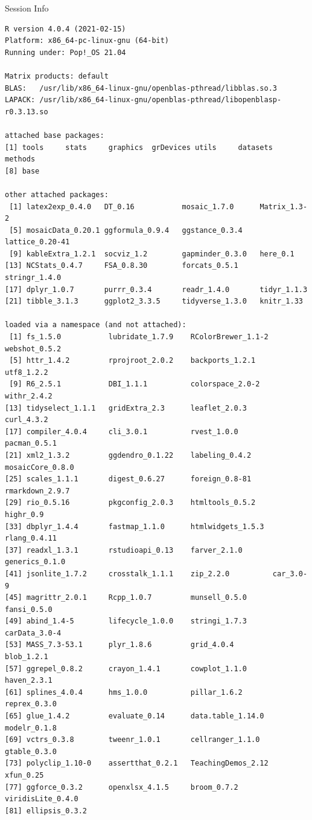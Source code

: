 \documentclass[10pt,handout]{beamer}\usepackage[]{graphicx}\usepackage[]{color}
\makeatletter
\newenvironment{kframe}{%
 \def\at@end@of@kframe{}%
 \ifinner\ifhmode%
  \def\at@end@of@kframe{\end{minipage}}%
  \begin{minipage}{\columnwidth}%
 \fi\fi%
 \def\FrameCommand##1{\hskip\@totalleftmargin \hskip-\fboxsep
 \colorbox{shadecolor}{##1}\hskip-\fboxsep
     \hskip-\linewidth \hskip-\@totalleftmargin \hskip\columnwidth}%
 \MakeFramed {\advance\hsize-\width
   \@totalleftmargin\z@ \linewidth\hsize
   \@setminipage}}%
 {\par\unskip\endMakeFramed%
 \at@end@of@kframe}
\newenvironment{knitrout}{}{} %
\makeatother
\begin{document}
\begin{frame}[fragile]{Session Info}
	\tiny
	
\begin{knitrout}\tiny
{}\color{fgcolor}\begin{kframe}
\begin{verbatim}
R version 4.0.4 (2021-02-15)
Platform: x86_64-pc-linux-gnu (64-bit)
Running under: Pop!_OS 21.04

Matrix products: default
BLAS:   /usr/lib/x86_64-linux-gnu/openblas-pthread/libblas.so.3
LAPACK: /usr/lib/x86_64-linux-gnu/openblas-pthread/libopenblasp-r0.3.13.so

attached base packages:
[1] tools     stats     graphics  grDevices utils     datasets  methods  
[8] base     

other attached packages:
 [1] latex2exp_0.4.0   DT_0.16           mosaic_1.7.0      Matrix_1.3-2     
 [5] mosaicData_0.20.1 ggformula_0.9.4   ggstance_0.3.4    lattice_0.20-41  
 [9] kableExtra_1.2.1  socviz_1.2        gapminder_0.3.0   here_0.1         
[13] NCStats_0.4.7     FSA_0.8.30        forcats_0.5.1     stringr_1.4.0    
[17] dplyr_1.0.7       purrr_0.3.4       readr_1.4.0       tidyr_1.1.3      
[21] tibble_3.1.3      ggplot2_3.3.5     tidyverse_1.3.0   knitr_1.33       

loaded via a namespace (and not attached):
 [1] fs_1.5.0           lubridate_1.7.9    RColorBrewer_1.1-2 webshot_0.5.2     
 [5] httr_1.4.2         rprojroot_2.0.2    backports_1.2.1    utf8_1.2.2        
 [9] R6_2.5.1           DBI_1.1.1          colorspace_2.0-2   withr_2.4.2       
[13] tidyselect_1.1.1   gridExtra_2.3      leaflet_2.0.3      curl_4.3.2        
[17] compiler_4.0.4     cli_3.0.1          rvest_1.0.0        pacman_0.5.1      
[21] xml2_1.3.2         ggdendro_0.1.22    labeling_0.4.2     mosaicCore_0.8.0  
[25] scales_1.1.1       digest_0.6.27      foreign_0.8-81     rmarkdown_2.9.7   
[29] rio_0.5.16         pkgconfig_2.0.3    htmltools_0.5.2    highr_0.9         
[33] dbplyr_1.4.4       fastmap_1.1.0      htmlwidgets_1.5.3  rlang_0.4.11      
[37] readxl_1.3.1       rstudioapi_0.13    farver_2.1.0       generics_0.1.0    
[41] jsonlite_1.7.2     crosstalk_1.1.1    zip_2.2.0          car_3.0-9         
[45] magrittr_2.0.1     Rcpp_1.0.7         munsell_0.5.0      fansi_0.5.0       
[49] abind_1.4-5        lifecycle_1.0.0    stringi_1.7.3      carData_3.0-4     
[53] MASS_7.3-53.1      plyr_1.8.6         grid_4.0.4         blob_1.2.1        
[57] ggrepel_0.8.2      crayon_1.4.1       cowplot_1.1.0      haven_2.3.1       
[61] splines_4.0.4      hms_1.0.0          pillar_1.6.2       reprex_0.3.0      
[65] glue_1.4.2         evaluate_0.14      data.table_1.14.0  modelr_0.1.8      
[69] vctrs_0.3.8        tweenr_1.0.1       cellranger_1.1.0   gtable_0.3.0      
[73] polyclip_1.10-0    assertthat_0.2.1   TeachingDemos_2.12 xfun_0.25         
[77] ggforce_0.3.2      openxlsx_4.1.5     broom_0.7.2        viridisLite_0.4.0 
[81] ellipsis_0.3.2    
\end{verbatim}
\end{kframe}
\end{knitrout}
	
\end{frame}
\end{document}
